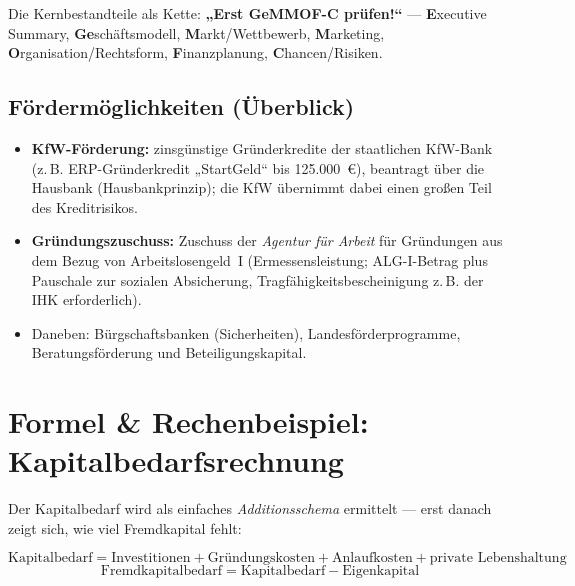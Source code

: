 \documentclass[11pt, a4paper]{article}
\begin{document}
\begin{eselsbruecke}
Die Kernbestandteile als Kette: \textbf{„Erst GeMMOF-C prüfen!``} ---
\textbf{E}xecutive Summary, \textbf{Ge}schäftsmodell, \textbf{M}arkt/Wettbewerb,
\textbf{M}arketing, \textbf{O}rganisation/Rechtsform, \textbf{F}inanzplanung,
\textbf{C}hancen/Risiken.
\end{eselsbruecke}

\subsection{Fördermöglichkeiten (Überblick)}

\begin{itemize}
  \item \textbf{KfW-Förderung:} zinsgünstige Gründerkredite der staatlichen KfW-Bank
    (z.\,B. ERP-Gründerkredit „StartGeld`` bis 125.000~€), beantragt über die Hausbank
    (Hausbankprinzip); die KfW übernimmt dabei einen großen Teil des Kreditrisikos.
  \item \textbf{Gründungszuschuss:} Zuschuss der \emph{Agentur für Arbeit} für Gründungen
    aus dem Bezug von Arbeitslosengeld~I (Ermessensleistung; ALG-I-Betrag plus Pauschale
    zur sozialen Absicherung, Tragfähigkeitsbescheinigung z.\,B. der IHK erforderlich).
  \item Daneben: Bürgschaftsbanken (Sicherheiten), Landesförderprogramme,
    Beratungsförderung und Beteiligungskapital.
\end{itemize}

\section{Formel \& Rechenbeispiel: Kapitalbedarfsrechnung}

Der Kapitalbedarf wird als einfaches \emph{Additionsschema} ermittelt --- erst danach
zeigt sich, wie viel Fremdkapital fehlt:

\[
\textrm{Kapitalbedarf} = \textrm{Investitionen} + \textrm{Gründungskosten}
+ \textrm{Anlaufkosten} + \textrm{private Lebenshaltung}
\]
\[
\textrm{Fremdkapitalbedarf} = \textrm{Kapitalbedarf} - \textrm{Eigenkapital}
\]
\end{document}
